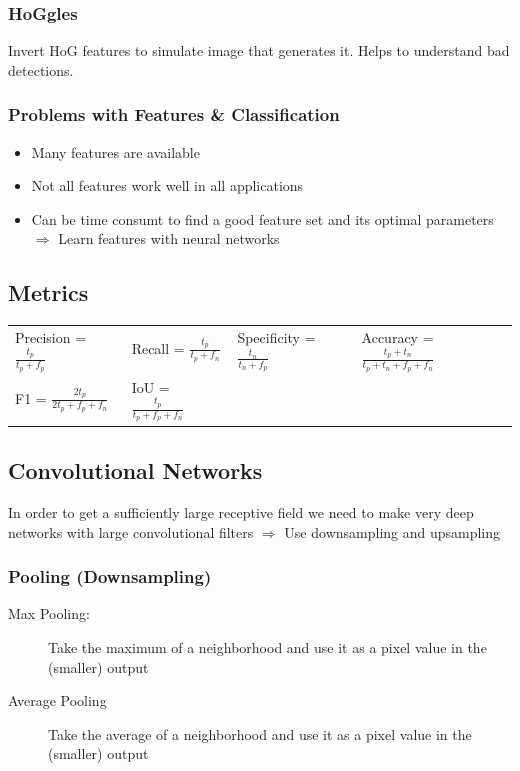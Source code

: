 \begin{multicols}{2}
    \subsubsection{HoGgles}
    \glqq Invert\grqq{} HoG features to simulate image that generates it.
    Helps to understand bad detections.

    \subsubsection{Problems with Features \& Classification}
    \begin{itemize}
        \item Many features are available
        \item Not all features work well in all applications
        \item Can be time consumt to find a good feature set and its optimal parameters $\Rightarrow$ Learn features with neural networks
    \end{itemize}
\end{multicols}

\subsection{Metrics}
\begin{tabular}{l l l l}
    Precision = $\frac{t_p}{t_p+f_p}$ & Recall = $\frac{t_p}{t_p+f_n}$  & Specificity = $\frac{t_n}{t_n+f_p}$ & Accuracy = $\frac{t_p+t_n}{t_p+t_n+f_p+f_n}$ \\
    F1 = $\frac{2t_p}{2t_p+f_p+f_n}$  & IoU = $\frac{t_p}{t_p+f_p+f_n}$
\end{tabular}

\subsection{Convolutional Networks}
In order to get a sufficiently large receptive field we need to make very deep networks with large convolutional filters $\Rightarrow$ Use downsampling and upsampling

\subsubsection{Pooling (Downsampling)}
\begin{description}
    \item[Max Pooling:] Take the maximum of a neighborhood and use it as a pixel value in the (smaller) output
    \item[Average Pooling] Take the average of a neighborhood and use it as a pixel value in the (smaller) output
\end{description}

